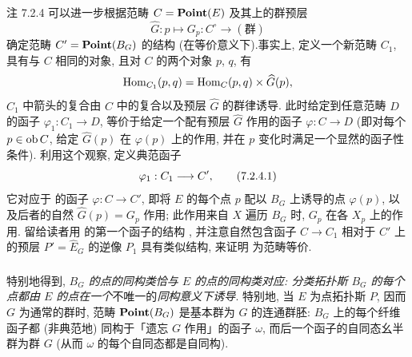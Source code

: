 \begin{enonce*}[remark]{注 7.2.4}
可以进一步根据范畴 $C=\operatorname{\mathbf{Point}}(E)$ 及其上的群预层
$$
\widehat{G}:p\longmapsto G_p: C^{\circ}\longrightarrow
(\text{群})
$$
确定范畴 $C'=\operatorname{\mathbf{Point}}(B_G)$ 的结构 (在等价意义下).\pageoriginale 事实上, 定义一个新范畴 $C_1$, 具有与 $C$ 相同的对象, 且对 $C$ 的两个对象 $p$, $q$, 有
$$
\operatorname{Hom}_{C_1}(p,q)=\operatorname{Hom}_C(p,q)\times \widehat{G}(p){},
$$
$C_1$ 中箭头的复合由 $C$ 中的复合以及预层 $\widehat{G}$ 的群律诱导. 此时给定到任意范畴 $D$ 的函子 $\varphi_1:C_1\rightarrow D$, 等价于给定一个配有预层 $\widehat{G}$ 作用的函子 $\varphi:C\rightarrow D$ (即对每个 $p\in \operatorname{ob} C$, 给定 $\widehat{G}(p)$ 在 $\varphi(p)$ 上的作用, 并在 $p$ 变化时满足一个显然的函子性条件). 利用这个观察, 定义典范函子
\begin{equation*}
\varphi_1:C_1\longrightarrow C'{},\tag{7.2.4.1}
\end{equation*}
它对应于  的函子 $\varphi:C\rightarrow C'$, 即将 $E$ 的每个点 $p$ 配以 $B_G$ 上诱导的点 $\varphi(p)$, 以及后者的自然 $\widehat{G}(p)=G_p$ 作用; 此作用来自 $X$ 遍历 $B_G$ 时, $G_p$ 在各 $X_p$ 上的作用. 留给读者用  的第一个函子的结构 , 并注意自然包含函子 $C\rightarrow C_1$ 相对于 $C'$ 上的预层 $P'=\widehat{E}_G$ 的逆像 $P_1$ 具有类似结构, 来证明  为范畴等价.
\end{enonce*}

\setcounter{subsubsection}{4}
\subsubsection{}
特别地\pageoriginale 得到, \emph{$B_G$ 的点的同构类恰与 $E$ 的点的同构类对应: 分类拓扑斯 $B_G$ 的每个点都由 $E$ 的点在一个}不唯一的\emph{同构意义下诱导}. 特别地, 当 $E$ 为点拓扑斯 $P$, 因而 $G$ 为通常的群时, 范畴 $\operatorname{\mathbf{Point}}(B_G)$ 是基本群为 $G$ 的连通群胚: $B_G$ 上的每个纤维函子都 (非典范地) 同构于「遗忘 $G$ 作用」的函子 $\omega$, 而后一个函子的自同态幺半群为群 $G$ (从而 $\omega$ 的每个自同态都是自同构).

